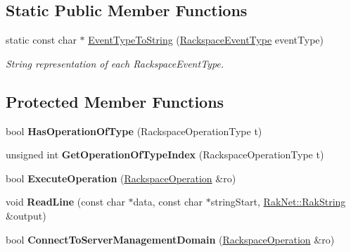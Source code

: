 \subsection*{Static Public Member Functions}
\begin{DoxyCompactItemize}
\item 
\hypertarget{class_rak_net_1_1_rackspace_af3cf70c0a306514868eba9c8d70dab72}{static const char $\ast$ \hyperlink{class_rak_net_1_1_rackspace_af3cf70c0a306514868eba9c8d70dab72}{Event\-Type\-To\-String} (\hyperlink{namespace_rak_net_a120cf6e1a0904cff45269f14c3c4c289}{Rackspace\-Event\-Type} event\-Type)}\label{class_rak_net_1_1_rackspace_af3cf70c0a306514868eba9c8d70dab72}

\begin{DoxyCompactList}\small\item\em String representation of each Rackspace\-Event\-Type. \end{DoxyCompactList}\end{DoxyCompactItemize}
\subsection*{Protected Member Functions}
\begin{DoxyCompactItemize}
\item 
\hypertarget{class_rak_net_1_1_rackspace_a6d9a08bab0265f9b163f33be3171bdf9}{bool {\bfseries Has\-Operation\-Of\-Type} (Rackspace\-Operation\-Type t)}\label{class_rak_net_1_1_rackspace_a6d9a08bab0265f9b163f33be3171bdf9}

\item 
\hypertarget{class_rak_net_1_1_rackspace_ab04633f7ecfd6a4160354aaebe361a69}{unsigned int {\bfseries Get\-Operation\-Of\-Type\-Index} (Rackspace\-Operation\-Type t)}\label{class_rak_net_1_1_rackspace_ab04633f7ecfd6a4160354aaebe361a69}

\item 
\hypertarget{class_rak_net_1_1_rackspace_aa4607b030132d14a4cfbfbfd1158c89f}{bool {\bfseries Execute\-Operation} (\hyperlink{struct_rak_net_1_1_rackspace_1_1_rackspace_operation}{Rackspace\-Operation} \&ro)}\label{class_rak_net_1_1_rackspace_aa4607b030132d14a4cfbfbfd1158c89f}

\item 
\hypertarget{class_rak_net_1_1_rackspace_aa0b0de53b0053f82a773e349ab543c26}{void {\bfseries Read\-Line} (const char $\ast$data, const char $\ast$string\-Start, \hyperlink{class_rak_net_1_1_rak_string}{Rak\-Net\-::\-Rak\-String} \&output)}\label{class_rak_net_1_1_rackspace_aa0b0de53b0053f82a773e349ab543c26}

\item 
\hypertarget{class_rak_net_1_1_rackspace_af5eebe3cb958153efa0d23aa4559e8f4}{bool {\bfseries Connect\-To\-Server\-Management\-Domain} (\hyperlink{struct_rak_net_1_1_rackspace_1_1_rackspace_operation}{Rackspace\-Operation} \&ro)}\label{class_rak_net_1_1_rackspace_af5eebe3cb958153efa0d23aa4559e8f4}

\end{DoxyCompactItemize}
